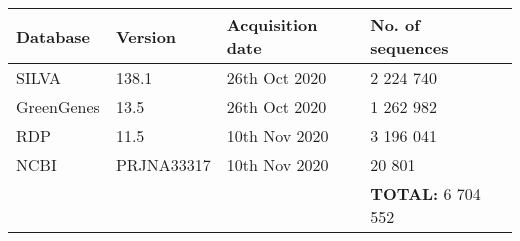\documentclass[border=2cm]{standalone}
\begin{document}
    \begin{tabular}{|p{3cm}|p{3cm}|p{3cm}|p{3cm}|}
        \hline
        \textbf{Database} & \textbf{Version} & \textbf{Acquisition date} & \textbf{No. of sequences}\\
        \hline 
        SILVA & 138.1 & 26th Oct 2020 & 2 224 740 \\
        
        GreenGenes & 13.5 & 26th Oct 2020 &1 262 982  \\
        
        RDP & 11.5 & 10th Nov 2020 &3 196 041  \\
        
        NCBI & PRJNA33317 & 10th Nov 2020 & 20 801  \\
        \hline
        \multicolumn{3}{l|}{}& \textbf{TOTAL:} 6 704 552 \\
        \cline{4-4}
        \end{tabular}

\end{document}

